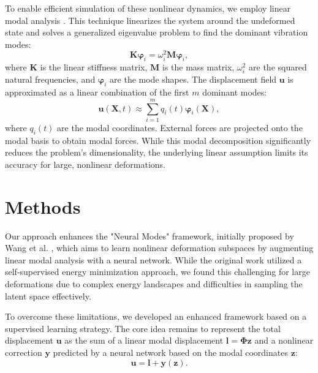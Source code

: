 \documentclass[11pt,a4paper,twocolumn]{article}
\renewcommand*{\phi}{\varphi}
\begin{document}
To enable efficient simulation of these nonlinear dynamics, we employ linear modal analysis \cite{Pentland_Williams_1989}. This technique linearizes the system around the undeformed state and solves a generalized eigenvalue problem to find the dominant vibration modes:
\begin{equation}
    \bm{K} \bm{\phi}_i = \omega_i^2 \bm{M} \bm{\phi}_i,
\label{eq:es:eigenvalue_problem}
\end{equation}
where $\bm{K}$ is the linear stiffness matrix, $\bm{M}$ is the mass matrix, $\omega_i^2$ are the squared natural frequencies, and $\bm{\phi}_i$ are the mode shapes. The displacement field $\bm{u}$ is approximated as a linear combination of the first $m$ dominant modes:
\begin{equation}
    \bm{u}(\bm{X},t) \approx \sum_{i=1}^{m} q_i(t) \bm{\phi}_i(\bm{X}),
\label{eq:es:modal_decomposition}
\end{equation}
where $q_i(t)$ are the modal coordinates. External forces are projected onto the modal basis to obtain modal forces. While this modal decomposition significantly reduces the problem's dimensionality, the underlying linear assumption limits its accuracy for large, nonlinear deformations.


\section{Methods}
\label{sec:es:methods}

Our approach enhances the "Neural Modes" framework, initially proposed by Wang et al. \cite{Wang_Du_Coros_Thomaszewski_2024}, which aims to learn nonlinear deformation subspaces by augmenting linear modal analysis with a neural network. While the original work utilized a self-supervised energy minimization approach, we found this challenging for large deformations due to complex energy landscapes and difficulties in sampling the latent space effectively.

To overcome these limitations, we developed an enhanced framework based on a supervised learning strategy. The core idea remains to represent the total displacement $\bm{u}$ as the sum of a linear modal displacement $\bm{l} = \bm{\Phi} \bm{z}$ and a nonlinear correction $\bm{y}$ predicted by a neural network based on the modal coordinates $\bm{z}$:
\begin{equation}
    \bm{u} = \bm{l} + \bm{y}(\bm{z}).
\label{eq:es:total_displacement_methods}
\end{equation}
\end{document}
